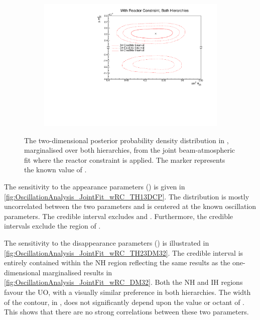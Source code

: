 \begin{figure}[h]
  \begin{subfigure}[t]{0.98\textwidth}
    \includegraphics[width=\textwidth, trim={0mm 0mm 0mm 0mm}, clip,page=1]{Figures/OA/JointFit_wRC/Contours_2D_th23_dm32_BH_1_wRC_UnSmeared_CredibleInterval.pdf}
  \end{subfigure}
  \caption{The two-dimensional posterior probability density distribution in , marginalised over both hierarchies, from the joint beam-atmospheric fit where the reactor constraint is applied. The marker represents the known value of .}
  \label{fig:OscillationAnalysis_JointFit_wRC_TH23DM32}
\end{figure}

The sensitivity to the appearance parameters () is given in \autoref{fig:OscillationAnalysis_JointFit_wRC_TH13DCP}. The distribution is mostly uncorrelated between the two parameters and is centered at the known oscillation parameters. The \quickmath{1\sigma} credible interval excludes  and . Furthermore, the \quickmath{3\sigma} credible intervals exclude the region of .

The sensitivity to the disappearance parameters () is illustrated in \autoref{fig:OscillationAnalysis_JointFit_wRC_TH23DM32}. The \quickmath{1\sigma} credible interval is entirely contained within the NH region reflecting the same results as the one-dimensional marginalised results in \autoref{fig:OscillationAnalysis_JointFit_wRC_DM32}. Both the NH and IH regions favour the UO, with a visually similar preference in both hierarchies. The width of the \quickmath{1\sigma} contour, in , does not significantly depend upon the value or octant of . This shows that there are no strong correlations between these two parameters.

